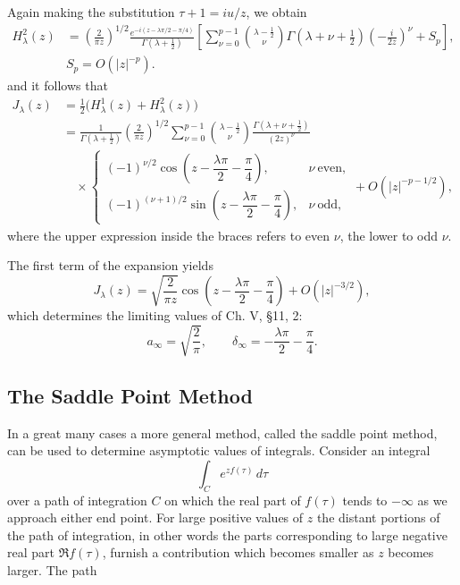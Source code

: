 Again making the substitution $\tau+1=iu/z$, we obtain
\begin{equation}\tag{90}
\begin{aligned}
H_\lambda^2(z)&=\left(\frac{2}{\pi z}\right)^{1/2}
\frac{e^{-i(z-\lambda\pi/2-\pi/4)}}{\Gamma(\lambda+\tfrac12)}\left[\sum_{\nu=0}^{p-1}{\lambda-\tfrac12\choose\nu}
\Gamma(\lambda+\nu+\tfrac12)\left(-\frac{i}{2z}\right)^\nu+S_p\right],\\
&S_p=O(|z|^{-p}).
\end{aligned}
\end{equation}
and it follows that
\begin{equation}\tag{91}
\begin{aligned}
J_\lambda(z)&=\tfrac12\bigl(H_\lambda^1(z)+H_\lambda^2(z)\bigr)\\
&=\frac1{\Gamma(\lambda+\tfrac12)}\left(\frac{2}{\pi z}\right)^{1/2}
\sum_{\nu=0}^{p-1}{\lambda-\tfrac12\choose\nu}
\frac{\Gamma(\lambda+\nu+\tfrac12)}{(2z)^\nu}\\
&\quad\times
\begin{cases}
(-1)^{\nu/2}\cos\left(z-\dfrac{\lambda\pi}{2}-\dfrac\pi4\right),&\nu\ \text{even},\\[4pt]
(-1)^{(\nu+1)/2}\sin\left(z-\dfrac{\lambda\pi}{2}-\dfrac\pi4\right),&\nu\ \text{odd},
\end{cases}
+O(|z|^{-p-1/2}),
\end{aligned}
\end{equation}
where the upper expression inside the braces refers to even $\nu$, the lower to odd $\nu$.

The first term of the expansion yields
\begin{equation}\tag{92}
J_\lambda(z)=\sqrt{\frac{2}{\pi z}}
\cos\left(z-\frac{\lambda\pi}{2}-\frac\pi4\right)+O(|z|^{-3/2}),
\end{equation}
which determines the limiting values of Ch. V, \S11, 2:
\[
a_\infty=\sqrt{\frac2\pi},\qquad
\delta_\infty=-\frac{\lambda\pi}{2}-\frac\pi4.
\]

\subsection{The Saddle Point Method}
In a great many cases a more general method, called the saddle point method, can be used to determine asymptotic values of integrals. Consider an integral
\[
\int_C e^{zf(\tau)}\,d\tau
\]
over a path of integration $C$ on which the real part of $f(\tau)$ tends to $-\infty$ as we approach either end point. For large positive values of $z$ the distant portions of the path of integration, in other words the parts corresponding to large negative real part $\Re f(\tau)$, furnish a contribution which becomes smaller as $z$ becomes larger. The path

